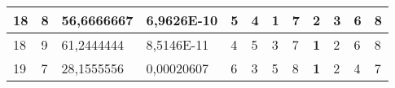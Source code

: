 \documentclass[conference]{IEEEtran}
\begin{document}
\begin{table*}[]
\begin{tabular}{|llll|llllllll|}
\multicolumn{1}{|l|}{18}                                                    & \multicolumn{1}{l|}{8}                                                        & \multicolumn{1}{l|}{56,6666667}                                                   & 6,9626E-10                     & \multicolumn{1}{l|}{5}                                                  & \multicolumn{1}{l|}{4}                                                  & \multicolumn{1}{l|}{\textbf{1}}                                         & \multicolumn{1}{l|}{7}                                                  & \multicolumn{1}{l|}{2}                                                  & \multicolumn{1}{l|}{3}                                                  & \multicolumn{1}{l|}{6}                                                  & 8                          \\ \hline
\multicolumn{1}{|l|}{18}                                                    & \multicolumn{1}{l|}{9}                                                        & \multicolumn{1}{l|}{61,2444444}                                                   & 8,5146E-11                     & \multicolumn{1}{l|}{4}                                                  & \multicolumn{1}{l|}{5}                                                  & \multicolumn{1}{l|}{3}                                                  & \multicolumn{1}{l|}{7}                                                  & \multicolumn{1}{l|}{\textbf{1}}                                         & \multicolumn{1}{l|}{2}                                                  & \multicolumn{1}{l|}{6}                                                  & 8                          \\ \hline
\multicolumn{1}{|l|}{19}                                                    & \multicolumn{1}{l|}{7}                                                        & \multicolumn{1}{l|}{28,1555556}                                                   & 0,00020607                     & \multicolumn{1}{l|}{6}                                                  & \multicolumn{1}{l|}{3}                                                  & \multicolumn{1}{l|}{5}                                                  & \multicolumn{1}{l|}{8}                                                  & \multicolumn{1}{l|}{\textbf{1}}                                         & \multicolumn{1}{l|}{2}                                                  & \multicolumn{1}{l|}{4}                                                  & 7                          \\ \hline

\end{tabular}
\end{table*}
\end{document}
